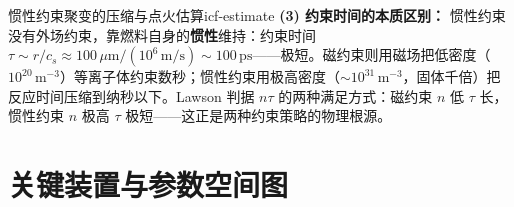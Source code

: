 \begin{example}{惯性约束聚变的压缩与点火估算}{icf-estimate}
\textbf{(3) 约束时间的本质区别：} 惯性约束没有外场约束，靠燃料自身的\textbf{惯性}维持：约束时间 $\tau \sim r/c_s \approx 100\,\mu\mathrm{m}/(10^6\,\mathrm{m/s}) \sim 100\,\mathrm{ps}$——极短。磁约束则用磁场把低密度（$10^{20}\,\mathrm{m^{-3}}$）等离子体约束数秒；惯性约束用极高密度（$\sim10^{31}\,\mathrm{m^{-3}}$，固体千倍）把反应时间压缩到纳秒以下。Lawson 判据 $n\tau$ 的两种满足方式：磁约束 $n$ 低 $\tau$ 长，惯性约束 $n$ 极高 $\tau$ 极短——这正是两种约束策略的物理根源。
\end{example}

\section{关键装置与参数空间图}

